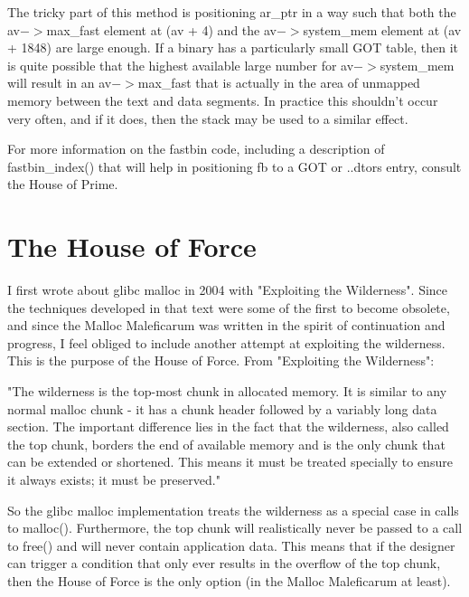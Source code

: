 \documentclass[12pt]{article}
\begin{document}
The tricky part of this method is positioning ar\_ptr in a way such
that both the av$->$max\_fast element at (av + 4) and the av$->$system\_mem element at (av + 1848) are large enough. If a binary
has a particularly small GOT table, then it is quite possible that
the highest available large number for av$->$system\_mem will result
in an av$->$max\_fast that is actually in the area of unmapped memory
between the text and data segments. In practice this shouldn't
occur very often, and if it does, then the stack may be used to a
similar effect.
\newline


For more information on the fastbin code, including a description
of fastbin\_index() that will help in positioning fb to a GOT or
..dtors entry, consult the House of Prime.
\newline

\section{The House of Force}

I first wrote about glibc malloc in 2004 with "Exploiting the
Wilderness". Since the techniques developed in that text were some
of the first to become obsolete, and since the Malloc Maleficarum
was written in the spirit of continuation and progress, I feel
obliged to include another attempt at exploiting the wilderness.
This is the purpose of the House of Force. From "Exploiting the
Wilderness":
\newline


"The wilderness is the top-most chunk in allocated memory. It is
similar to any normal malloc chunk - it has a chunk header followed
by a variably long data section. The important difference lies in
the fact that the wilderness, also called the top chunk, borders
the end of available memory and is the only chunk that can be
extended or shortened. This means it must be treated specially to
ensure it always exists; it must be preserved."
\newline


So the glibc malloc implementation treats the wilderness as a
special case in calls to malloc(). Furthermore, the top chunk will
realistically never be passed to a call to free() and will never
contain application data. This means that if the designer can
trigger a condition that only ever results in the overflow of the
top chunk, then the House of Force is the only option (in the
Malloc Maleficarum at least).
\newline
\end{document}
